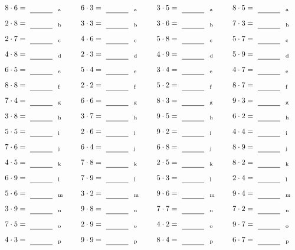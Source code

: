 \documentclass
[
  draft    = true,
  fontsize = 11pt,
  parskip  = half-
]
{scrartcl}
\begin{document}
\par\vfill\par
\begin{align*}
    \pline{8\cdot6}&=\rline{a}
  & \pline{6\cdot3}&=\rline{a}
  & \pline{3\cdot5}&=\rline{a}
  & \pline{8\cdot5}&=\rline{a} \\[1ex]
    \pline{2\cdot8}&=\rline{b}
  & \pline{3\cdot3}&=\rline{b}
  & \pline{3\cdot6}&=\rline{b}
  & \pline{7\cdot3}&=\rline{b} \\[1ex]
    \pline{2\cdot7}&=\rline{c}
  & \pline{4\cdot6}&=\rline{c}
  & \pline{5\cdot8}&=\rline{c}
  & \pline{5\cdot7}&=\rline{c} \\[1ex]
    \pline{4\cdot8}&=\rline{d}
  & \pline{2\cdot3}&=\rline{d}
  & \pline{4\cdot9}&=\rline{d}
  & \pline{5\cdot9}&=\rline{d} \\[1ex]
    \pline{6\cdot5}&=\rline{e}
  & \pline{5\cdot4}&=\rline{e}
  & \pline{3\cdot4}&=\rline{e}
  & \pline{4\cdot7}&=\rline{e} \\[1ex]
    \pline{8\cdot8}&=\rline{f}
  & \pline{2\cdot2}&=\rline{f}
  & \pline{5\cdot2}&=\rline{f}
  & \pline{8\cdot7}&=\rline{f} \\[1ex]
    \pline{7\cdot4}&=\rline{g}
  & \pline{6\cdot6}&=\rline{g}
  & \pline{8\cdot3}&=\rline{g}
  & \pline{9\cdot3}&=\rline{g} \\[1ex]
    \pline{3\cdot8}&=\rline{h}
  & \pline{3\cdot7}&=\rline{h}
  & \pline{9\cdot5}&=\rline{h}
  & \pline{6\cdot2}&=\rline{h} \\[1ex]
    \pline{5\cdot5}&=\rline{i}
  & \pline{2\cdot6}&=\rline{i}
  & \pline{9\cdot2}&=\rline{i}
  & \pline{4\cdot4}&=\rline{i} \\[1ex]
    \pline{7\cdot6}&=\rline{j}
  & \pline{6\cdot4}&=\rline{j}
  & \pline{6\cdot8}&=\rline{j}
  & \pline{8\cdot9}&=\rline{j} \\[1ex]
    \pline{4\cdot5}&=\rline{k}
  & \pline{7\cdot8}&=\rline{k}
  & \pline{2\cdot5}&=\rline{k}
  & \pline{8\cdot2}&=\rline{k} \\[1ex]
    \pline{6\cdot9}&=\rline{l}
  & \pline{7\cdot9}&=\rline{l}
  & \pline{5\cdot3}&=\rline{l}
  & \pline{2\cdot4}&=\rline{l} \\[1ex]
    \pline{5\cdot6}&=\rline{m}
  & \pline{3\cdot2}&=\rline{m}
  & \pline{9\cdot6}&=\rline{m}
  & \pline{9\cdot4}&=\rline{m} \\[1ex]
    \pline{3\cdot9}&=\rline{n}
  & \pline{9\cdot8}&=\rline{n}
  & \pline{7\cdot7}&=\rline{n}
  & \pline{7\cdot2}&=\rline{n} \\[1ex]
    \pline{7\cdot5}&=\rline{o}
  & \pline{2\cdot9}&=\rline{o}
  & \pline{4\cdot2}&=\rline{o}
  & \pline{9\cdot7}&=\rline{o} \\[1ex]
    \pline{4\cdot3}&=\rline{p}
  & \pline{9\cdot9}&=\rline{p}
  & \pline{8\cdot4}&=\rline{p}
  & \pline{6\cdot7}&=\rline{p}
\end{align*}
\end{document}
